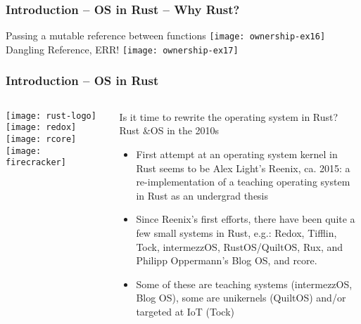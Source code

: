 \begin{frame}[plain]	
	\frametitle{Introduction -- OS in Rust -- Why Rust?}
	\centering
	Passing a mutable reference between functions
	\texttt{[image: ownership-ex16]}
	Dangling Reference, ERR!
	\texttt{[image: ownership-ex17]}

\end{frame}
\begin{frame}[plain]
	\frametitle{Introduction -- OS in Rust}
	
	
	
	\begin{columns}
		
		\begin{column}{.2\textwidth}
			
			\texttt{[image: rust-logo]}
			\texttt{[image: redox]}
			\texttt{[image: rcore]}
			\texttt{[image: firecracker]}
		\end{column}
		
		\begin{column}{.8\textwidth}
			
		Is it time to rewrite the operating
		system in Rust?
		 \\
		
	Rust \&OS in the 2010s

\begin{itemize}
	
	\item  First attempt at an operating system kernel in Rust seems to be
	Alex Light’s Reenix, ca. 2015: a re-implementation of a teaching
	operating system in Rust as an undergrad thesis
	
	
	\item  Since Reenix’s first efforts, there have been quite a few small
	systems in Rust, e.g.: Redox, Tifflin, Tock, intermezzOS,
	RustOS/QuiltOS, Rux, and Philipp Oppermann’s Blog OS, and rcore.
	
	\item Some of these are teaching systems (intermezzOS, Blog OS),
	some are unikernels (QuiltOS) and/or targeted at IoT (Tock)
	
	
\end{itemize}

		\end{column}
		
		
	\end{columns}
	
	
\end{frame}

